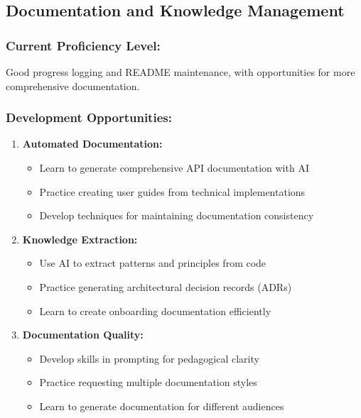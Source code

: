\documentclass[12pt,a4paper]{article}
\begin{document}
\subsection{Documentation and Knowledge Management}

\subsubsection*{Current Proficiency Level:}
Good progress logging and README maintenance, with opportunities for more comprehensive documentation.

\subsubsection*{Development Opportunities:}

\begin{enumerate}
    \item \textbf{Automated Documentation:}
    \begin{itemize}
        \item Learn to generate comprehensive API documentation with AI
        \item Practice creating user guides from technical implementations
        \item Develop techniques for maintaining documentation consistency
    \end{itemize}
    
    \item \textbf{Knowledge Extraction:}
    \begin{itemize}
        \item Use AI to extract patterns and principles from code
        \item Practice generating architectural decision records (ADRs)
        \item Learn to create onboarding documentation efficiently
    \end{itemize}
    
    \item \textbf{Documentation Quality:}
    \begin{itemize}
        \item Develop skills in prompting for pedagogical clarity
        \item Practice requesting multiple documentation styles
        \item Learn to generate documentation for different audiences
    \end{itemize}
\end{enumerate}
\end{document}
